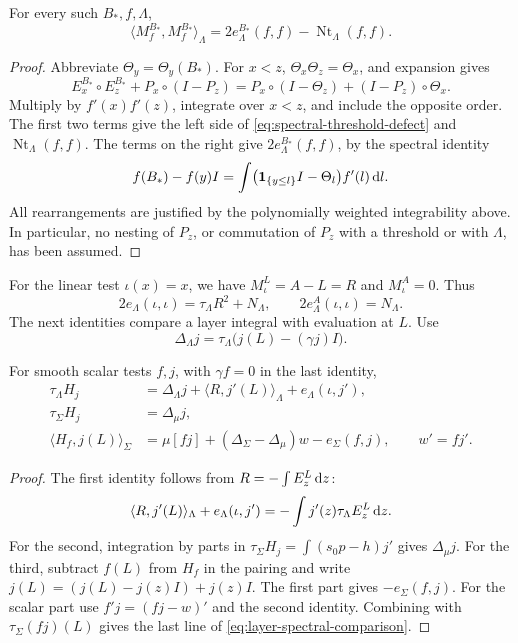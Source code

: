 \begin{lemma}\label{lem:threshold-defect}
 For every such $B_*,f,\Lambda$,
 \begin{equation}\label{eq:spectral-threshold-defect}
  \langle M_f^{B_*},M_f^{B_*}\rangle_\Lambda
    =2e_\Lambda^{B_*}(f,f)-\operatorname{Nt}_\Lambda(f,f).
 \end{equation}
\end{lemma}

\begin{proof}
Abbreviate $\Theta_y=\Theta_y(B_*)$. For $x<z$, $\Theta_x\Theta_z=\Theta_x$, and expansion gives
\[
 E_x^{B_*}\circ E_z^{B_*}+P_x\circ(I-P_z)
   =P_x\circ(I-\Theta_z)+(I-P_z)\circ\Theta_x.
\]
Multiply by $f'(x)f'(z)$, integrate over $x<z$, and include the opposite order. The first two terms give the left side of \eqref{eq:spectral-threshold-defect} and $\operatorname{Nt}_\Lambda(f,f)$. The terms on the right give $2e_\Lambda^{B_*}(f,f)$, by the spectral identity
\[
 f(B_*)-f(y)I
   =\int\bigl(\mathbf1_{\{y\leq l\}}I-\Theta_l\bigr)f'(l)\,\mathrm{d} l.
\]
All rearrangements are justified by the polynomially weighted integrability above. In particular, no nesting of $P_z$, or commutation of $P_z$ with a threshold or with $\Lambda$, has been assumed.
\end{proof}

For the linear test $\iota(x)=x$, we have $M_\iota^L=A-L=R$ and $M_\iota^A=0$. Thus
\[
 2e_\Lambda(\iota,\iota)=\tau_\Lambda R^2+N_\Lambda,\qquad
 2e_\Lambda^A(\iota,\iota)=N_\Lambda.
\]
The next identities compare a layer integral with evaluation at $L$. Use
\[
 \Delta_\Lambda j=\tau_\Lambda\bigl(j(L)-(\gamma j)I\bigr).
\]

\begin{lemma}\label{lem:layer-spectral}
 For smooth scalar tests $f,j$, with $\gamma f=0$ in the last identity,
 \begin{equation}\label{eq:layer-spectral-comparison}
 \begin{aligned}
  \tau_\Lambda H_j
   &=\Delta_\Lambda j+\langle R,j'(L)\rangle_\Lambda
                         +e_\Lambda(\iota,j'),\\
  \tau_\Sigma H_j&=\Delta_\mu j,\\
  \langle H_f,j(L)\rangle_\Sigma
   &=\mu[fj]+(\Delta_\Sigma-\Delta_\mu)w-e_\Sigma(f,j),
       \qquad w'=fj'.
 \end{aligned}
 \end{equation}
\end{lemma}

\begin{proof}
The first identity follows from $R=-\int E_z^L\,\mathrm{d} z$:
\[
 \langle R,j'(L)\rangle_\Lambda+e_\Lambda(\iota,j')
     =-\int j'(z)\tau_\Lambda E_z^L\,\mathrm{d} z.
\]
For the second, integration by parts in $\tau_\Sigma H_j=\int(s_0p-h)j'$ gives $\Delta_\mu j$. For the third, subtract $f(L)$ from $H_f$ in the pairing and write $j(L)=(j(L)-j(z)I)+j(z)I$. The first part gives $-e_\Sigma(f,j)$. For the scalar part use $f'j=(fj-w)'$ and the second identity. Combining with $\tau_\Sigma(fj)(L)$ gives the last line of \eqref{eq:layer-spectral-comparison}.
\end{proof}

